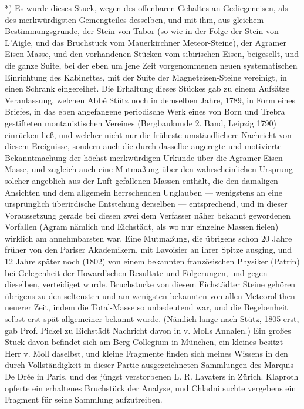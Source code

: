 \documentclass[a4paper, 11pt, oneside, german]{article}
\begin{document}
*) Es wurde dieses Stuck, wegen des offenbaren Gehaltes an Gediegeneisen, als des merkwürdigsten Gemengteiles desselben, und mit ihm, aus gleichem Bestimmungsgrunde, der Stein von Tabor (so wie in der Folge der Stein von L'Aigle, und das Bruchstuck vom Mauerkirchner Meteor-Steine), der Agramer Eisen-Masse, und den vorhandenen Stücken vom sibirischen Eisen, beigesellt, und die ganze Suite, bei der eben um jene Zeit vorgenommenen neuen systematischen Einrichtung des Kabinettes, mit der Suite der Magneteisen-Steine vereinigt, in einen Schrank eingereihet.  
Die Erhaltung dieses Stückes gab zu einem Aufsätze Veranlassung, welchen Abbé Stütz noch in demselben Jahre, 1789, in Form eines Briefes, in das eben angefangene periodische Werk eines von Born und Trebra gestifteten montanistischen Vereines (Bergbaukunde 2. Band, Leipzig 1790) einrücken ließ, und welcher nicht nur die früheste umständlichere Nachricht von diesem Ereignisse, sondern auch die durch dasselbe angeregte und motivierte Bekanntmachung der höchst merkwürdigen Urkunde über die Agramer Eisen-Masse, und zugleich auch eine Mutmaßung über den wahrscheinlichen Ursprung solcher angeblich aus der Luft gefallenen Massen enthält, die den damaligen Ansichten und dem allgemein herrschenden Unglauben --- wenigstens an eine ursprünglich überirdische Entstehung derselben --- entsprechend, und in dieser Voraussetzung gerade bei diesen zwei dem Verfasser näher bekannt gewordenen Vorfallen (Agram nämlich und Eichstädt, als wo nur einzelne Massen fielen) wirklich am annehmbarsten war. Eine Mutmaßung, die übrigens schon 20 Jahre früher von den Pariser Akademikern, mit Lavoisier an ihrer Spitze ausging, und 12 Jahre später noch (1802) von einem bekannten französischen Physiker (Patrin) bei Gelegenheit der Howard'schen Resultate und Folgerungen, und gegen dieselben, verteidiget wurde.  
Bruchstucke von diesem Eichstädter Steine gehören übrigens zu den seltensten und am wenigsten bekannten von allen Meteorolithen neuerer Zeit, indem die Total-Masse so unbedeutend war, und die Begebenheit selbst erst spät allgemeiner bekannt wurde. (Nämlich lange nach Stütz, 1805 erst, gab Prof. Pickel zu Eichstädt Nachricht davon in v. Molls Annalen.) Ein großes Stuck davon befindet sich am Berg-Collegium in München, ein kleines besitzt Herr v. Moll daselbst, und kleine Fragmente finden sich meines Wissens in den durch Vollständigkeit in dieser Partie ausgezeichneten Sammlungen des Marquis De Drée in Paris, und des jüngst verstorbenen L. R. Lavaters in Zürich. Klaproth opferte ein erhaltenes Bruchstück der Analyse, und Chladni suchte vergebens ein Fragment für seine Sammlung aufzutreiben.
\end{document}
